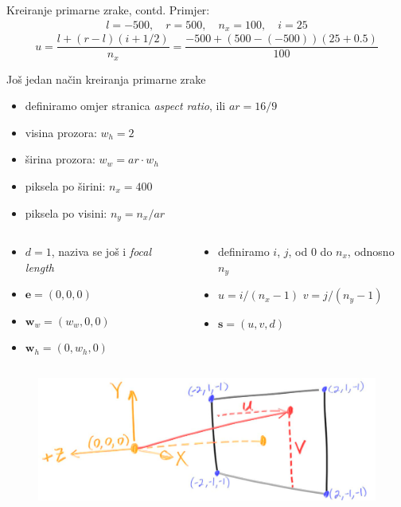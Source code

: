 \documentclass[9pt]{beamer}
\begin{document}
\begin{frame}{Kreiranje primarne zrake, contd.}
Primjer:
\begin{align*}
l = -500, \quad r = 500, \quad n_x = 100, \quad i=25
\end{align*}
$$
u = \frac{l + (r-l)(i+1/2)}{n_x} = \frac{-500 + (500- (-500))(25+0.5)}{100}
$$
\end{frame}

\begin{frame}{Još jedan način kreiranja primarne zrake}
\begin{itemize}
	\item definiramo omjer stranica \textit{aspect ratio}, ili $ar = 16/9$
	\item visina prozora: $w_h = 2$
	\item širina prozora: $w_w = ar\cdot w_h$
	\item piksela po širini: $n_x = 400$
	\item piksela po visini: $n_y = n_x/ar$
\end{itemize}
\begin{columns}
	\begin{column}{0.5\linewidth}
		\begin{itemize}
			\item $d = 1$, naziva se još i \textit{focal length}
			\item $\mathbf{e}= (0, 0, 0)$
			\item $\mathbf{w}_w= (w_w, 0, 0)$
			\item $\mathbf{w}_h= (0, w_h, 0)$
		\end{itemize}
	\end{column}
	\begin{column}{0.5\linewidth}
		\begin{itemize}
			\item definiramo $i$, $j$, od $0$ do $n_x$, odnosno $n_y$
			\item $u= i/(n_x-1)$ \quad  $v= j/(n_y-1)$
			\item $\textbf{s} = (u, v, d)$
		\end{itemize}
	\end{column}
\end{columns}

\begin{figure}
	\includegraphics[width=0.5\linewidth]{./slike/fig-cam-geom.png}
\end{figure}
\end{frame}
\end{document}

